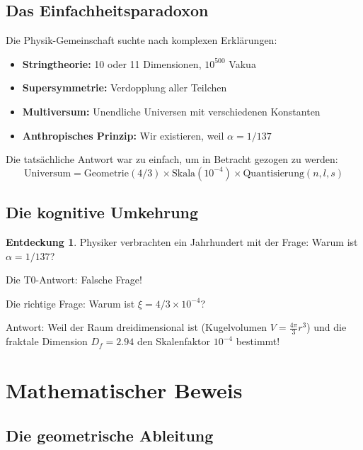 \documentclass[12pt,a4paper]{article}
\theoremstyle{definition}
\newtheorem{entdeckung}{Entdeckung}[section]
\begin{document}
	\subsection{Das Einfachheitsparadoxon}
	
	Die Physik-Gemeinschaft suchte nach komplexen Erklärungen:
	
	\begin{itemize}
		\item \textbf{Stringtheorie:} 10 oder 11 Dimensionen, $10^{500}$ Vakua
		\item \textbf{Supersymmetrie:} Verdopplung aller Teilchen
		\item \textbf{Multiversum:} Unendliche Universen mit verschiedenen Konstanten
		\item \textbf{Anthropisches Prinzip:} Wir existieren, weil $\alpha = 1/137$
	\end{itemize}
	
	Die tatsächliche Antwort war zu einfach, um in Betracht gezogen zu werden:
	\begin{equation}
		\boxed{\text{Universum} = \text{Geometrie}(4/3) \times \text{Skala}(10^{-4}) \times \text{Quantisierung}(n,l,s)}
	\end{equation}
	
	\subsection{Die kognitive Umkehrung}
	
	\begin{entdeckung}
		Physiker verbrachten ein Jahrhundert mit der Frage: Warum ist $\alpha = 1/137$?
		
		Die T0-Antwort: Falsche Frage!
		
		Die richtige Frage: Warum ist $\xi = 4/3 \times 10^{-4}$?
		
Antwort: Weil der Raum dreidimensional ist (Kugelvolumen $V = \frac{4\pi}{3} r^3$) und die fraktale Dimension $D_f = 2.94$ den Skalenfaktor $10^{-4}$ bestimmt!
	\end{entdeckung}
	
	\section{Mathematischer Beweis}
	
	\subsection{Die geometrische Ableitung}
	
\end{document}
